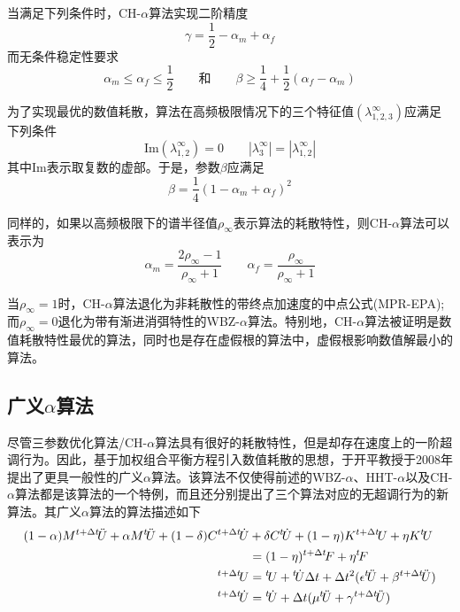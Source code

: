 当满足下列条件时，CH-$\alpha$算法实现二阶精度
\begin{equation}
\gamma=\frac{1}{2}-\alpha_m+\alpha_f
\end{equation}
而无条件稳定性要求
\begin{equation}
\alpha_m\le\alpha_f\le\frac{1}{2}\qquad\text{和}\qquad\beta\ge\frac{1}{4}+\frac{1}{2}(\alpha_f-\alpha_m)
\end{equation}

为了实现最优的数值耗散，算法在高频极限情况下的三个特征值$(\lambda_{1,2,3}^{\infty})$应满足下列条件
\begin{equation}
\text{Im} (\lambda_{1,2}^{\infty})=0\qquad|\lambda_{3}^{\infty}|=|\lambda_{1,2}^{\infty}|
\end{equation}
其中Im表示取复数的虚部。于是，参数$\beta$应满足
\begin{equation}
\beta=\frac{1}{4}(1-\alpha_m+\alpha_f)^2
\end{equation}

同样的，如果以高频极限下的谱半径值$\rho_{\infty}$表示算法的耗散特性，则CH-$\alpha$算法可以表示为
\begin{equation}
\alpha_m=\frac{2\rho_{\infty}-1}{\rho_{\infty}+1}\qquad\alpha_f=\frac{\rho_{\infty}}{\rho_{\infty}+1}
\end{equation}

当$\rho_{\infty}=1$时，CH-$\alpha$算法退化为非耗散性的带终点加速度的中点公式(MPR-EPA);而$\rho_{\infty}=0$退化为带有渐进消弭特性的WBZ-$\alpha$算法。特别地，CH-$\alpha$算法被证明是数值耗散特性最优的算法，同时也是存在虚假根的算法中，虚假根影响数值解最小的算法\cite{Hulbert1994b}。

\subsection{广义$\alpha$算法}

尽管三参数优化算法/CH-$\alpha$算法具有很好的耗散特性，但是却存在速度上的一阶超调行为。因此，基于加权组合平衡方程引入数值耗散的思想，于开平教授于2008年提出了更具一般性的广义$\alpha$算法\cite{Yu2008a}。该算法不仅使得前述的WBZ-$\alpha$、HHT-$\alpha$以及CH-$\alpha$算法都是该算法的一个特例，而且还分别提出了三个算法对应的无超调行为的新算法。其广义$\alpha$算法的算法描述如下
\begin{subequations}
\begin{align}
(1-\alpha)M{^{t+\Delta t}\!\ddot{U}}+\alpha M{^{t}\!\ddot{U}}+(1-\delta)C{^{t+\Delta t}\!\dot{U}}&+\delta C{^t\!\dot{U}}+(1-\eta)K{^{t+\Delta t}\!U}+\eta K{^t\!U}\notag\\
&=(1-\eta){^{t+\Delta t}\!F}+\eta {^t\!F}\\
{^{t+\Delta t}\!{U}}&={^t\!U}+{^t\!\dot{U}}\Delta t+\Delta t^2(\epsilon{^t\!\ddot{U}}+\beta{^{t+\Delta t}\!\ddot{U}})\\
{^{t+\Delta t}\!\dot{U}}&={^t\!\dot{U}}+\Delta t(\mu{^t\!\ddot{U}}+\gamma{^{t+\Delta t}\!\ddot{U}})
\end{align}
\end{subequations}

